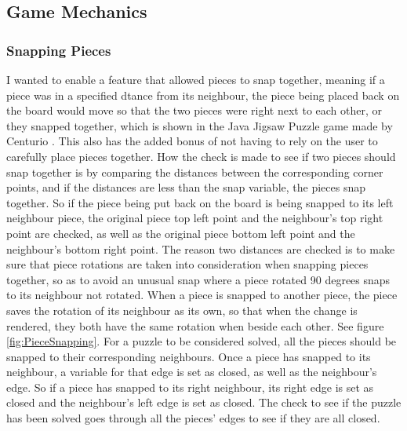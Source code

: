 \documentclass{article}
\begin{document}
\subsection{Game Mechanics}

\subsubsection{Snapping Pieces}
I wanted to enable a feature that allowed pieces to snap together, meaning if a
piece was in a specified dtance from its neighbour, the piece being placed back
on the board would move so that the two pieces were right next to each other, or
they snapped together, which is shown in the Java Jigsaw Puzzle game made by
Centurio \cite{ref:SourceJigsaw}. This also has the added bonus of not having to
rely on the user to carefully place pieces together. How the check is made to
see if two pieces should snap together is by comparing the distances between the
corresponding corner points, and if the distances are less than the snap
variable, the pieces snap together. So if the piece being put back on the board
is being snapped to its left neighbour piece, the original piece top left point
and the neighbour's top right point are checked, as well as the original piece
bottom left point and the neighbour's bottom right point. The reason two
distances are checked is to make sure that piece rotations are taken into
consideration when snapping pieces together, so as to avoid an unusual snap
where a piece rotated 90 degrees snaps to its neighbour not rotated. When a
piece is snapped to another piece, the piece saves the rotation of its neighbour
as its own, so that when the change is rendered, they both have the same
rotation when beside each other. See figure \ref{fig:PieceSnapping}. For a
puzzle to be considered solved, all the pieces should be snapped to their
corresponding neighbours. Once a piece has snapped to its neighbour, a variable
for that edge is set as closed, as well as the neighbour's edge. So if a piece
has snapped to its right neighbour, its right edge is set as closed and the
neighbour's left edge is set as closed. The check to see if the puzzle has been
solved goes through all the pieces' edges to see if they are all closed.
\end{document}
